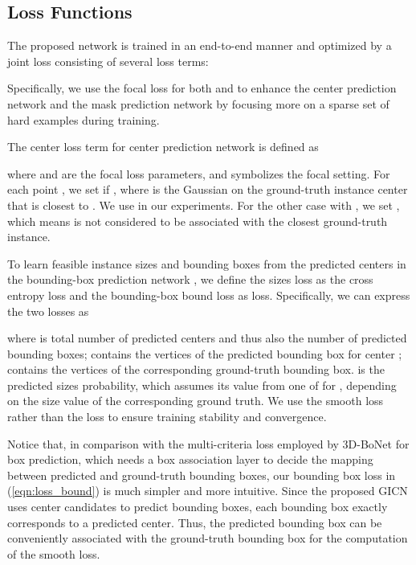 \documentclass[runningheads]{llncs}
\begin{document}
\subsection{Loss Functions}
The proposed network is trained in an end-to-end manner and optimized by a joint loss  consisting of several loss terms:

Specifically, we use the focal loss \cite{LinPRKP17} for both  and  to enhance the center prediction network  and the mask prediction network  by focusing more on a sparse set of hard examples during training. 

The center loss term  for center prediction network  is defined as 

where  and  are the focal loss parameters, and  symbolizes the focal setting. For each point , we set  if , where  is the Gaussian on the ground-truth instance center  that is closest to . We use  in our experiments. For the other case with , we set , which means  is not considered to be associated with the closest ground-truth instance.
  







To learn feasible instance sizes and bounding boxes from the predicted centers in the bounding-box prediction network , we define the sizes loss  as the cross entropy loss and the bounding-box bound loss  as  loss. Specifically, we can express the two losses as


where  is total number of predicted centers and thus also the number of predicted bounding boxes;  contains the vertices of the predicted bounding box for center ;  contains the vertices of the corresponding ground-truth bounding box.  is the predicted sizes probability, which assumes its value from one of  for , depending on the size value of the corresponding ground truth. We use the smooth  loss rather than the  loss to ensure training stability and convergence.

Notice that, in comparison with the multi-criteria loss employed by 3D-BoNet \cite{YangWCHWMT19} for box prediction, which needs a box association layer to decide the mapping between predicted and ground-truth bounding boxes,
our bounding box loss  in (\ref{eqn:loss_bound}) is much simpler and more intuitive. 
Since the proposed GICN uses center candidates to predict bounding boxes, each bounding box exactly corresponds to a predicted center. Thus, the predicted bounding box can be conveniently associated with the ground-truth bounding box for the computation of the smooth  loss. 
\end{document}
